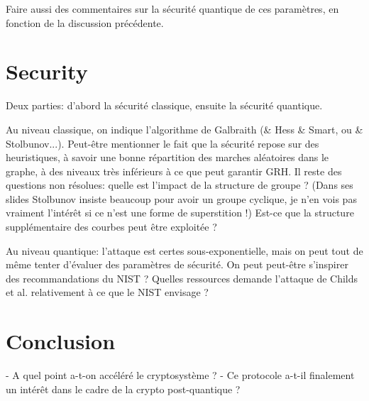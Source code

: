 \documentclass{article}
\theoremstyle{definition}
\begin{document}
Faire aussi des commentaires sur la sécurité quantique de ces
paramètres, en fonction de la discussion précédente. 

\section{Security}

Deux parties: d'abord la sécurité classique, ensuite la sécurité quantique.

Au niveau classique, on indique l'algorithme de Galbraith (\& Hess \&
Smart, ou \& Stolbunov...). Peut-être mentionner le fait que la
sécurité repose sur des heuristiques, à savoir une bonne répartition
des marches aléatoires dans le graphe, à des niveaux très inférieurs à
ce que peut garantir GRH.  Il reste des questions non résolues: quelle
est l'impact de la structure de groupe ? (Dans ses slides Stolbunov
insiste beaucoup pour avoir un groupe cyclique, je n'en vois pas
vraiment l'intérêt si ce n'est une forme de superstition !)  Est-ce
que la structure supplémentaire des courbes peut être exploitée ?

Au niveau quantique: l'attaque est certes sous-exponentielle, mais on
peut tout de même tenter d'évaluer des paramètres de sécurité. On peut
peut-être s'inspirer des recommandations du NIST ? Quelles ressources
demande l'attaque de Childs et al. relativement à ce que le NIST
envisage ?


\section{Conclusion}

- A quel point a-t-on accéléré le cryptosystème ?
- Ce protocole a-t-il finalement un intérêt dans le cadre de la crypto post-quantique ?
\end{document}
